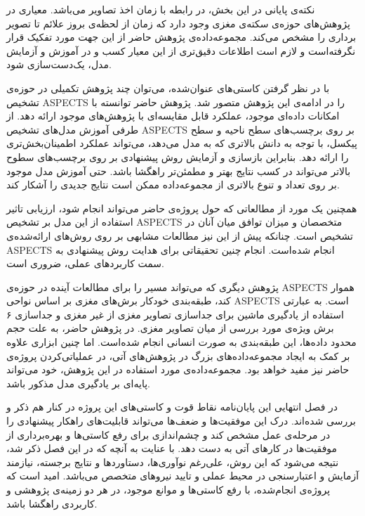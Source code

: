 نکته‌ی پایانی در این بخش، در رابطه با زمان اخذ تصاویر می‌باشد.
معیاری در پژوهش‌های حوزه‌ی سکته‌ی مغزی وجود دارد که زمان از لحظه‌ی بروز علائم تا تصویر برداری را مشخص می‌کند.
مجموعه‌داده‌ی پژوهش حاضر از این جهت مورد تفکیک قرار نگرفته‌است و لازم است اطلاعات دقیق‌تری از این معیار کسب و در آموزش و آزمایش مدل، یک‌دست‌سازی شود.


با در نظر گرفتن کاستی‌های عنوان‌شده، می‌توان چند پژوهش تکمیلی در حوزه‌ی تشخیص ASPECTS را در ادامه‌ی این پژوهش متصور شد.
پژوهش حاضر توانسته با امکانات داده‌ای موجود، عملکرد قابل مقایسه‌ای با پژوهش‌های موجود ارائه دهد.
از طرفی
آموزش مدل‌های تشخیص ASPECTS بر روی برچسب‌های سطح ناحیه و سطح پیکسل، با توجه به دانش بالاتری که به مدل می‌دهد، می‌تواند عملکرد اطمینان‌بخش‌تری را ارائه دهد.
بنابراین بازسازی و آزمایش روش پیشنهادی بر روی برچسب‌های سطوح بالاتر می‌تواند در کسب نتایج بهتر و مطمئن‌تر راهگشا باشد.
حتی آموزش مدل موجود بر روی تعداد و تنوع بالاتری از مجموعه‌داده ممکن است نتایج جدیدی را آشکار کند.

همچنین یک مورد از مطالعاتی که حول پروژه‌ی حاضر می‌تواند انجام شود، ارزیابی تاثیر استفاده از این مدل بر تشخیص ASPECTS متخصصان و 
میزان توافق میان آنان در تشخیص است.
چنانکه پیش از این نیز مطالعات مشابهی بر روی روش‌های ارائه‌شده‌ی ASPECTS انجام شده‌است.
انجام چنین تحقیقاتی برای هدایت روش پیشنهادی به سمت کاربرد‌های عملی، ضروری است.

پژوهش دیگری که می‌تواند مسیر را برای مطالعات آینده در حوزه‌ی ASPECTS هموار کند، 
طبقه‌بندی خودکار برش‌های مغزی بر اساس نواحی ASPECTS است.
به عبارتی استفاده از یادگیری ماشین برای جداسازی تصاویر مغزی از غیر مغزی و جداسازی ۶ برش ویژه‌ی مورد بررسی از میان تصاویر مغزی.
در پژوهش حاضر، به علت حجم محدود داد‌ه‌ها، این طبقه‌بندی به صورت انسانی انجام شده‌است.
اما چنین ابزاری علاوه بر 
کمک به ایجاد مجموعه‌داده‌های بزرگ در پژوهش‌های آتی، در عملیاتی‌کردن پروژه‌ی حاضر نیز مفید خواهد بود.
مجموعه‌داده‌ی مورد استفاده در این پژوهش، خود می‌تواند پایه‌ای بر یادگیری مدل مذکور باشد.


در فصل انتهایی این پایان‌نامه
نقاط قوت و کاستی‌های این پروژه در کنار هم ذکر و بررسی شده‌اند.
درک این موفقیت‌ها و ضعف‌ها می‌تواند قابلیت‌های راهکار پیشنهادی را در مرحله‌ی عمل مشخص کند و چشم‌اندازی برای رفع کاستی‌ها و 
بهره‌برداری از موفقیت‌ها در کار‌های آتی به دست دهد.
با عنایت به آنچه که در این فصل ذکر شد، نتیجه می‌شود که این روش، علی‌رغم نوآوری‌ها، دستاورد‌ها و نتایج برجسته، نیازمند آزمایش و 
اعتبارسنجی در محیط عملی و تایید نیروهای متخصص می‌باشد. امید است که پروژه‌ی انجام‌شده، با رفع کاستی‌ها و موانع موجود، در هر دو زمینه‌ی پژوهشی و کاربردی راهگشا باشد.